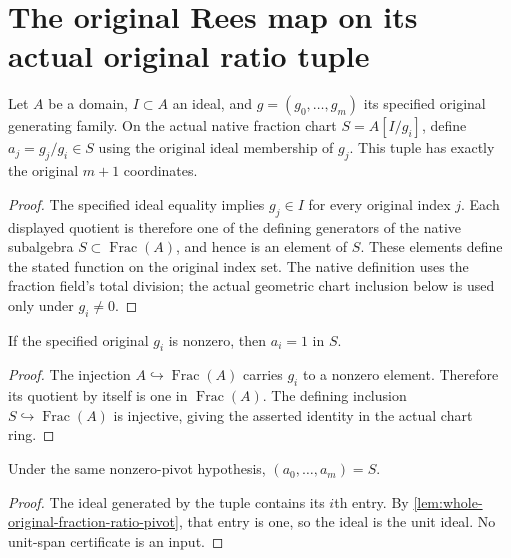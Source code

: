 \section{The original Rees map on its actual original ratio tuple}
\begin{definition}
\label{def:whole-original-fraction-ratio-tuple}
\leanok
Let $A$ be a domain, $I\subset A$ an ideal, and
$g=(g_0,\ldots,g_m)$ its specified original generating family.
On the actual native fraction chart $S=A[I/g_i]$, define
$a_j=g_j/g_i\in S$ using the original ideal membership of $g_j$.
This tuple has exactly the original $m+1$ coordinates.
\end{definition}
\begin{proof}
The specified ideal equality implies $g_j\in I$ for every original index $j$.
Each displayed quotient is therefore one of the defining generators of the
native subalgebra $S\subset\operatorname{Frac}(A)$, and hence is an element
of $S$. These elements define the stated function on the original index set.
The native definition uses the fraction field's total division; the actual
geometric chart inclusion below is used only under $g_i\ne0$.
\end{proof}
\begin{lemma}
\label{lem:whole-original-fraction-ratio-pivot}
\leanok
If the specified original $g_i$ is nonzero, then $a_i=1$ in $S$.
\end{lemma}
\begin{proof}
The injection $A\hookrightarrow\operatorname{Frac}(A)$ carries $g_i$ to a
nonzero element. Therefore its quotient by itself is one in
$\operatorname{Frac}(A)$. The defining inclusion $S\hookrightarrow\operatorname{Frac}(A)$
is injective, giving the asserted identity in the actual chart ring.
\end{proof}
\begin{lemma}
\label{lem:whole-original-fraction-ratio-span}
\leanok
Under the same nonzero-pivot hypothesis, $(a_0,\ldots,a_m)=S$.
\end{lemma}
\begin{proof}
The ideal generated by the tuple contains its $i$th entry. By
\ref{lem:whole-original-fraction-ratio-pivot}, that entry is one, so the
ideal is the unit ideal. No unit-span certificate is an input.
\end{proof}
